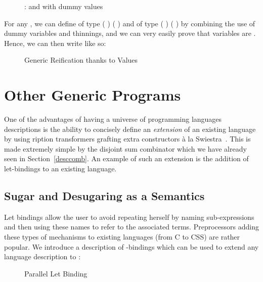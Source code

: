 \begin{figure}[h]
\caption{:  and with dummy values}
\end{figure}

For any  , we can define  of
type {( )  ( \AF{++} )} and  of
type {( )  ( \AF{++} )} by combining the use
of dummy variables and thinnings, and we can very easily prove that variables
are . Hence, we can then write  like so:

\begin{figure}[h]
\caption{Generic Reification thanks to  Values}
\end{figure}




\section{Other Generic Programs}

One of the advantages of having a universe of programming languages
descriptions is the ability to concisely define an \emph{extension}
of an existing language by using ription transformers
grafting extra constructors à la Swiestra~\citeyear{swierstra_2008}.
This is made extremely simple by the
disjoint sum combinator  which we have already seen
in Section~\ref{desccomb}.
An example of such an extension is the addition of let-bindings to
an existing language.

\subsection{Sugar and Desugaring as a Semantics}\label{section:letbinding}

Let bindings allow the user to avoid repeating herself by naming
sub-expressions and then using these names to refer to the associated
terms. Preprocessors adding these types of mechanisms to existing
languages (from C to CSS) are rather popular. We introduce a
description of -bindings which can be used to extend any
language description  to   :

\begin{figure}[h]
\caption{Parallel Let Binding}
\end{figure}

